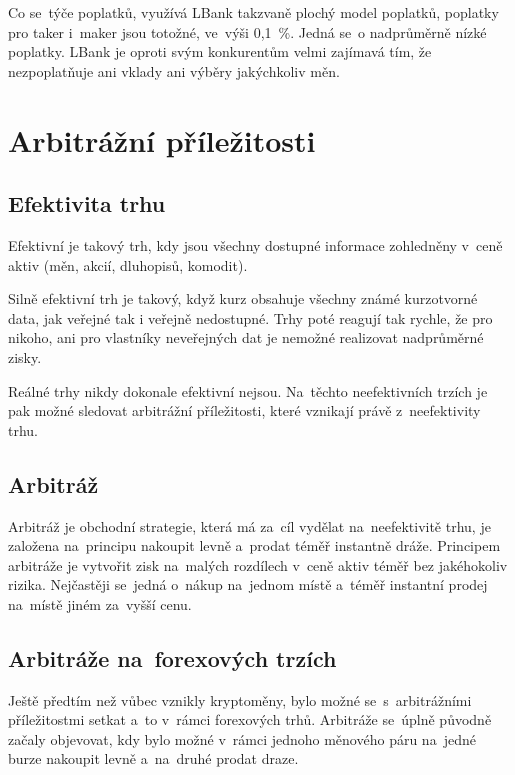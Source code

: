 \documentclass[thesis=B,czech]{FITthesis}[2019/03/21]
\begin{document}
Co se~týče poplatků, využívá LBank takzvaně plochý model poplatků, poplatky pro taker i~maker jsou totožné, ve~výši 0,1~\%. Jedná se~o nadprůměrně nízké poplatky. LBank je oproti svým konkurentům velmi zajímavá tím, že nezpoplatňuje ani vklady ani výběry jakýchkoliv měn. \cite{cryptowisser_lbank}


\section{Arbitrážní příležitosti}
\subsection{Efektivita trhu}
Efektivní je takový trh, kdy jsou všechny dostupné informace zohledněny v~ceně aktiv (měn, akcií, dluhopisů, komodit).\cite{efektivita_trhu}

Silně efektivní trh je takový, když kurz obsahuje všechny známé kurzotvorné data, jak veřejné tak i veřejně nedostupné. Trhy poté reagují tak rychle, že pro nikoho, ani pro vlastníky neveřejných dat je nemožné realizovat nadprůměrné zisky. \cite{efektivnost_trhu}

Reálné trhy nikdy dokonale efektivní nejsou. Na~těchto neefektivních trzích je pak možné sledovat arbitrážní příležitosti, které vznikají právě z~neefektivity trhu. \cite{what_is_arbitage} \cite{pecev} 

\subsection{Arbitráž}
Arbitráž je obchodní strategie, která má za~cíl vydělat na~neefektivitě trhu, je založena na~principu nakoupit levně a~prodat téměř instantně dráže. Principem arbitráže je vytvořit zisk na~malých rozdílech v~ceně aktiv téměř bez jakéhokoliv rizika. Nejčastěji se~jedná o~nákup na~jednom místě a~téměř instantní prodej na~místě jiném za~vyšší cenu. \cite{Capital}

\subsection{Arbitráže na~forexových trzích}
Ještě předtím než vůbec vznikly kryptoměny, bylo možné se~s~arbitrážními příležitostmi setkat a~to v~rámci forexových trhů. Arbitráže se~úplně původně začaly objevovat, kdy bylo možné v~rámci jednoho měnového páru na~jedné burze nakoupit levně a~na~druhé prodat draze. 
\end{document}
